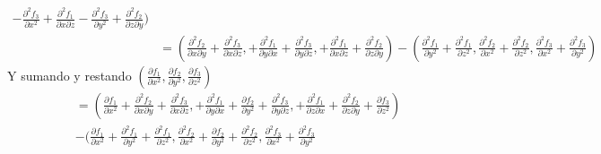 \documentclass{article}
\begin{document}
\begin{enumerate}
{\begin{enumerate}
{\begin{align*}
                    -\frac{\partial^2f_3}{\partial x^2}
                    +\frac{\partial^2f_1}{\partial x \partial z}
                    -\frac{\partial^2f_3}{\partial y^2}
                    +\frac{\partial^2f_2}{\partial z \partial y}
                    )\\
                    &=
                    (
                    \frac{\partial^2f_2}{\partial x \partial y}
                    +\frac{\partial^2f_3}{\partial x \partial z},
                    +\frac{\partial^2f_1}{\partial y \partial x}
                    +\frac{\partial^2f_3}{\partial y \partial z},
                    +\frac{\partial^2f_1}{\partial x \partial z}
                    +\frac{\partial^2f_2}{\partial z \partial y}
                    )
                    -
                    (
                    \frac{\partial^2f_1}{\partial y^2}
                    +\frac{\partial^2f_1}{\partial z^2},
                    \frac{\partial^2f_2}{\partial x^2}
                    +\frac{\partial^2f_2}{\partial z^2},
                    \frac{\partial^2f_3}{\partial x^2}
                    +\frac{\partial^2f_3}{\partial y^2}
                    )
                \end{align*}
                Y sumando y restando $(\frac{\partial f_1}{\partial x^2},
                \frac{\partial f_2}{\partial y^2},
                \frac{\partial f_3}{\partial z^2})$
                \begin{align*}
                    &=(
                    \frac{\partial f_1}{\partial x^2}
                    +\frac{\partial^2f_2}{\partial x \partial y}
                    +\frac{\partial^2f_3}{\partial x \partial z},
                    +\frac{\partial^2f_1}{\partial y \partial x}
                    +\frac{\partial f_2}{\partial y^2}
                    +\frac{\partial^2f_3}{\partial y \partial z},
                    +\frac{\partial^2f_1}{\partial z \partial x}
                    +\frac{\partial^2f_2}{\partial z \partial y}
                    +\frac{\partial f_3}{\partial z^2}
                    )\\
                    &-
                    (
                    \frac{\partial f_1}{\partial x^2}
                    +\frac{\partial^2f_1}{\partial y^2}
                    +\frac{\partial^2f_1}{\partial z^2},
                    \frac{\partial^2f_2}{\partial x^2}
                    +\frac{\partial f_2}{\partial y^2}
                    +\frac{\partial^2f_2}{\partial z^2},
                    \frac{\partial^2f_3}{\partial x^2}
                    +\frac{\partial^2f_3}{\partial y^2}

\end{align*}}
\end{enumerate}}
\end{enumerate}
\end{document}
